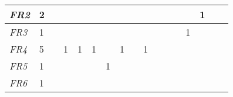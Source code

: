 \begin{table}[]
{\begin{tabular}{|l|l|l|l|l|l|l|l|l|l|l|l|l|l|l|l|l|}
\textit{FR2}  & 2                                                     &                                                       &    &                                                       &    &                                                       &                                                       &    &    &                                                       &    &                                                  &                                                  & 1  &    &    \\ \hline
\textit{FR3}  & 1                                                     &                                                       &    &                                                       &    &                                                       &                                                       &    &    &                                                       &    &                                                  & 1                                                &    &    &    \\ \hline
\textit{FR4}  & 5                                                     &                                                       & 1  & 1                                                     & 1  &                                                       & 1                                                     &    & 1  &                                                       &    &                                                  &                                                  &    &    &    \\ \hline
\textit{FR5}  & 1                                                     &                                                       &    &                                                       &    & 1                                                     &                                                       &    &    &                                                       &    &                                                  &                                                  &    &    &    \\ \hline
\textit{FR6}  & 1                                                     &                                                       &    &                                                       &    &                                                       &                                                       &    &    &                                                       &    &                                                  &                                                  &    &    &    \\ \hline

\end{tabular}}
\end{table}
